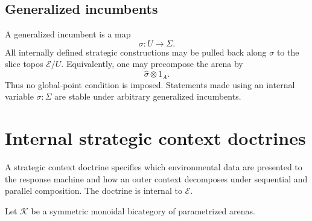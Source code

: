 \subsection{Generalized incumbents}

A generalized incumbent is a map
\[
  \sigma:U\longrightarrow\Sigma.
\]
All internally defined strategic constructions may be pulled back along \(\sigma\) to the slice
topos \(\mathcal E/U\). Equivalently, one may precompose the arena by
\[
  \widehat\sigma\otimes1_A.
\]
Thus no global-point condition is imposed. Statements made using an internal variable
\(\sigma:\Sigma\) are stable under arbitrary generalized incumbents.

\section{Internal strategic context doctrines}
\label{sec:strategic-context-doctrines}

A strategic context doctrine specifies which environmental data are presented to the response
machine and how an outer context decomposes under sequential and parallel composition. The doctrine
is internal to \(\mathcal E\).

Let \(\mathcal K\) be a symmetric monoidal bicategory of parametrized arenas.

